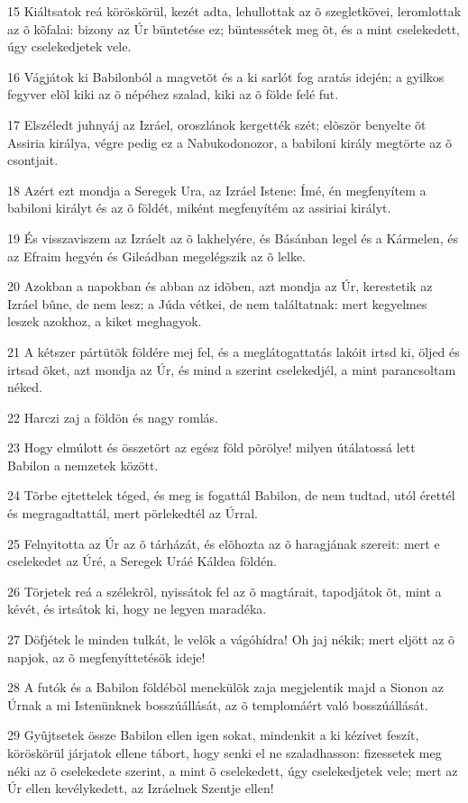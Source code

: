 \par 15 Kiáltsatok reá köröskörül, kezét adta, lehullottak az õ szegletkövei, leromlottak az õ kõfalai: bizony az Úr büntetése ez; büntessétek meg õt, és a mint cselekedett, úgy cselekedjetek vele.
\par 16 Vágjátok ki Babilonból a magvetõt és a ki sarlót fog aratás idején; a gyilkos fegyver elõl kiki az õ népéhez szalad, kiki az õ földe felé fut.
\par 17 Elszéledt juhnyáj az Izráel, oroszlánok kergették szét; elõször benyelte õt Assiria királya, végre pedig ez a Nabukodonozor,  a babiloni király megtörte az õ csontjait.
\par 18 Azért ezt mondja a Seregek Ura, az Izráel Istene: Ímé, én megfenyítem a babiloni királyt és az õ földét, miként megfenyítém az assiriai királyt.
\par 19 És visszaviszem az Izráelt az õ lakhelyére, és Básánban legel és a Kármelen, és az Efraim hegyén és Gileádban megelégszik az õ lelke.
\par 20 Azokban a napokban és abban az idõben, azt mondja az Úr, kerestetik az Izráel bûne, de nem lesz; a Júda vétkei, de nem találtatnak: mert kegyelmes leszek azokhoz, a kiket meghagyok.
\par 21 A kétszer pártütõk földére mej fel, és a meglátogattatás lakóit irtsd ki, öljed és irtsad õket, azt mondja az Úr, és mind a szerint cselekedjél, a mint parancsoltam néked.
\par 22 Harczi zaj a földön és nagy romlás.
\par 23 Hogy elmúlott és összetört az egész föld põrölye! milyen útálatossá lett Babilon a nemzetek között.
\par 24 Tõrbe ejtettelek téged, és meg is fogattál Babilon, de nem tudtad, utól érettél és megragadtattál, mert pörlekedtél az Úrral.
\par 25 Felnyitotta az Úr az õ tárházát, és elõhozta az õ haragjának szereit: mert e cselekedet az Úré, a Seregek Uráé Káldea földén.
\par 26 Törjetek reá a szélekrõl, nyissátok fel az õ magtárait, tapodjátok õt, mint a kévét, és irtsátok ki, hogy ne legyen maradéka.
\par 27 Döfjétek le minden tulkát, le velök a vágóhídra! Oh jaj nékik; mert eljött az õ napjok, az õ megfenyíttetésök ideje!
\par 28 A futók és a Babilon földébõl menekülõk zaja megjelentik majd a Sionon az Úrnak a mi Istenünknek bosszúállását, az õ templomáért való bosszúállását.
\par 29 Gyûjtsetek össze Babilon ellen igen sokat, mindenkit a ki kézívet feszít, köröskörül járjatok ellene tábort, hogy senki el ne szaladhasson: fizessetek meg néki az õ cselekedete szerint, a mint õ cselekedett, úgy cselekedjetek vele; mert az Úr ellen kevélykedett, az Izráelnek Szentje ellen!
